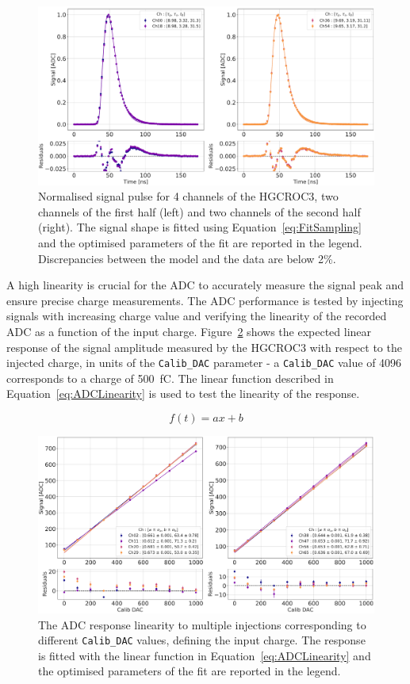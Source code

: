 \begin{figure}
    \centering
    \includegraphics[width=0.75\linewidth]{Figures/HGCAL/FitSampling.pdf}
    \caption{Normalised signal pulse for 4 channels of the HGCROC3, two channels of the first half (left) and two channels of the second half (right). The signal shape is fitted using Equation~\ref{eq:FitSampling} and the optimised parameters of the fit are reported in the legend. Discrepancies between the model and the data are below 2\%.}
    \label{fig:FitSampling}
\end{figure}

A high linearity is crucial for the ADC to accurately measure the signal peak and ensure precise charge measurements. The ADC performance is tested by injecting signals with increasing charge value and verifying the linearity of the recorded ADC as a function of the input charge. Figure~\ref{fig:ADC_Injection} shows the expected linear response of the signal amplitude measured by the HGCROC3 with respect to the injected charge, in units of the \texttt{Calib\_DAC} parameter - a \texttt{Calib\_DAC} value of 4096 corresponds to a charge of 500~fC. The linear function described in Equation~\ref{eq:ADCLinearity} is used to test the linearity of the response.

\begin{equation}
    f(t) = ax + b
\label{eq:ADCLinearity}
\end{equation}

\begin{figure}
    \centering
    \includegraphics[width=0.75\linewidth]{Figures/HGCAL/ADC_Injection.pdf}
    \caption{The ADC response linearity to multiple injections corresponding to different \texttt{Calib\_DAC} values, defining the input charge. The  response is fitted with the linear function in Equation~\ref{eq:ADCLinearity} and the optimised parameters of the fit are reported in the legend.}
    \label{fig:ADC_Injection}
\end{figure}

